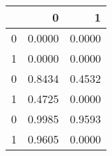 \begin{tabular}{lrr}
\toprule
{} &       0 &       1 \\
\midrule
0 &  0.0000 &  0.0000 \\
1 &  0.0000 &  0.0000 \\
0 &  0.8434 &  0.4532 \\
1 &  0.4725 &  0.0000 \\
0 &  0.9985 &  0.9593 \\
1 &  0.9605 &  0.0000 \\
\bottomrule
\end{tabular}
